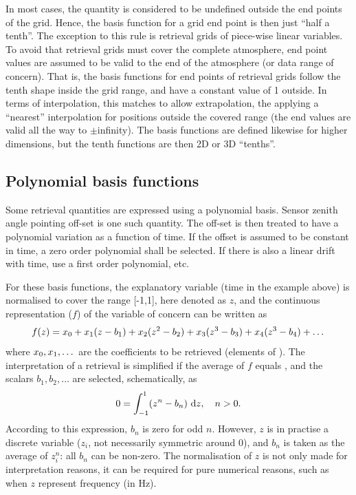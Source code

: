 In most cases, the quantity is considered to be undefined outside the end
points of the grid. Hence, the basis function for a grid end point is then just
``half a tenth''. The exception to this rule is retrieval grids of piece-wise
linear variables. To avoid that retrieval grids must cover the complete
atmosphere, end point values are assumed to be valid to the end of the
atmosphere (or data range of concern). That is, the basis functions for end
points of retrieval grids follow the tenth shape inside the grid range, and
have a constant value of 1 outside. In terms of interpolation, this matches to
allow extrapolation, the applying a ``nearest'' interpolation for positions
outside the covered range (the end values are valid all the way to
$\pm$infinity).
The basis functions are defined likewise for higher dimensions, but the
tenth functions are then 2D or 3D ``tenths''.




\subsection{Polynomial basis functions}
\label{sec:wfuns:basis2}
%
Some retrieval quantities are expressed using a polynomial basis. Sensor zenith
angle pointing off-set is one such quantity. The off-set is then treated to
have a polynomial variation as a function of time. If the offset is assumed to
be constant in time, a zero order polynomial shall be selected. If there is
also a linear drift with time, use a first order polynomial, etc.

For these basis functions, the explanatory variable (time in the example above)
is normalised to cover the range [-1,1], here denoted as $z$, and the
continuous representation ($f$) of the variable of concern can be written as
\begin{equation}
  f(z) = x_{0} + x_{1}(z-b_1) + x_{2}(z^2-b_2) + 
                     x_{3}(z^3-b_3) + x_{4}(z^3-b_4) + \dots  
\end{equation}
where $x_{0}, x_{1}, \dots$ are the coefficients to be retrieved
(elements of \SttVct). The interpretation of a retrieval is simplified if the
average of $f$ equals , and the scalars $b_1, b_2, \dots$ are
selected, schematically, as
\begin{equation}
  0 = \int_{-1}^1 \!\left(z^n-b_n\right) \, \mathrm{d} z, \quad n>0.
\end{equation}
According to this expression, $b_n$ is zero for odd $n$. However, $z$ is in
practise a discrete variable ($z_i$, not necessarily symmetric around 0), and
$b_n$ is taken as the average of $z_i^n$: all $b_n$ can be non-zero. The
normalisation of $z$ is not only made for interpretation reasons, it can be
required for pure numerical reasons, such as when $z$ represent frequency (in
Hz).


